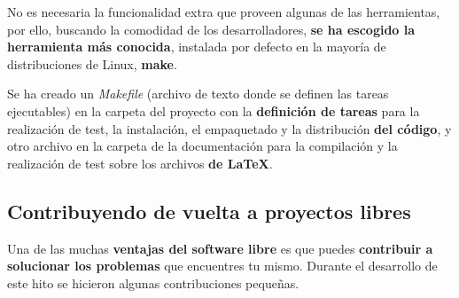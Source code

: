 No es necesaria la funcionalidad extra que proveen algunas de las herramientas, por ello, buscando la comodidad de los desarrolladores, \textbf{se ha escogido la herramienta más conocida}, instalada por defecto en la mayoría de distribuciones de Linux,  \textbf{make}.

Se ha creado un \textit{Makefile} (archivo de texto donde se definen las tareas ejecutables)  en la carpeta del proyecto con la \textbf{definición de tareas} para la realización de test, la instalación, el empaquetado y la distribución \textbf{del código}, y otro archivo en la carpeta de la documentación para la compilación y la realización de test sobre los archivos \textbf{de LaTeX}.


\subsection{Contribuyendo de vuelta a proyectos libres}

Una de las muchas \textbf{ventajas del software libre} es que puedes \textbf{contribuir a solucionar los problemas} que encuentres tu mismo. Durante el desarrollo de este hito se hicieron algunas contribuciones pequeñas.

